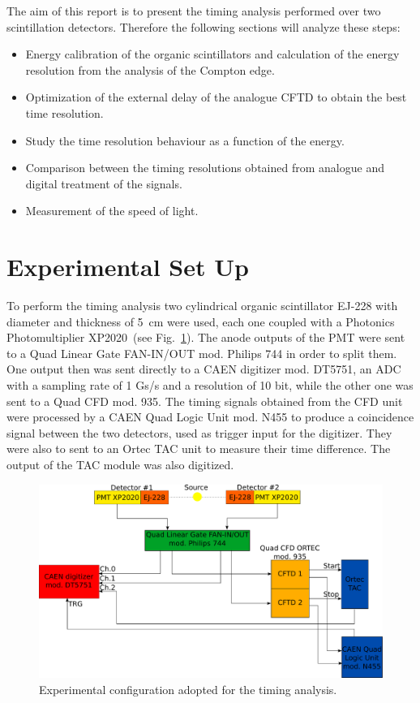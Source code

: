 The aim of this report is to present the timing analysis performed over two scintillation detectors. Therefore the  following sections will analyze these steps:
\begin{itemize}
\item Energy calibration of the organic scintillators and
calculation of the energy resolution from the analysis of
the Compton edge.
\item Optimization of the external delay of the analogue
CFTD to obtain the best time resolution.
\item Study the time resolution behaviour as a function of the
energy.
\item Comparison between the timing resolutions obtained
from analogue and digital treatment of the signals.
\item Measurement of the speed of light. 
\end{itemize}

\section*{Experimental Set Up}
To perform the timing analysis two cylindrical organic scintillator EJ-228 with diameter and thickness of 5~cm were used, each one coupled with a Photonics Photomultiplier XP2020~(see Fig.~\ref{fig:Set_up}). The anode outputs of the PMT were sent to a Quad Linear Gate FAN-IN/OUT mod. Philips 744 in order to split them. One output then was sent directly to a CAEN digitizer mod. DT5751, an ADC with a sampling rate of 1 Gs/s and a resolution of 10 bit, while the other one was sent to a Quad CFD mod. 935. The timing signals obtained from the CFD unit were processed by a CAEN Quad Logic Unit mod. N455 to produce a coincidence signal between the two detectors, used as trigger input for the digitizer. They were also to sent to an Ortec TAC unit to measure their time difference. The output of the TAC module was also digitized.

\begin{figure}[h!]
	\centering
	\includegraphics[width=\textwidth]{immagini/SetUp.pdf}
	\caption{Experimental configuration adopted for the timing analysis.}
	\label{fig:Set_up}
\end{figure}